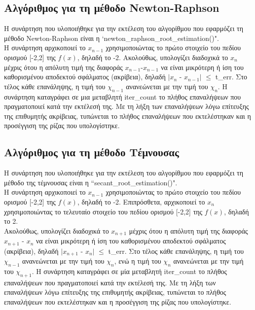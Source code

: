 \documentclass[a4paper,11pt]{article}
\newcommand{\lt}{\latintext}
\begin{document}
\subsection*{Αλγόριθμος για τη μέθοδο {\lt Newton-Raphson }}
Η συνάρτηση που υλοποιήθηκε για την εκτέλεση του αλγορίθμου που εφαρμόζει τη μέθοδο {\lt Newton-Raphson } είναι η {\lt `newton\_raphson\_root\_estimation()"}.\\
Η συνάρτηση αρχικοποιεί το {$x_{n-1}$} χρησιμοποιώντας το πρώτο στοιχείο του πεδίου ορισμού [-2,2] της {\lt $f(x)$}, δηλαδή το -2. Ακολούθως, υπολογίζει διαδοχικά το  {$x_{n}$} μέχρις ότου
η απόλυτη τιμή της διαφοράς {$x_{n-1}$}-{$x_{n-1}$} να είναι μικρότερη ή ίση του καθορισμένου αποδεκτού σφάλματος (ακρίβεια), δηλαδή $|${$x_{n}$} - {$x_{n-1}$}$|$ {$\leq$} {\lt t\_err}. Στο τέλος κάθε επανάληψης, η τιμή 		του {$χ_{n-1}$} ανανεώνεται με την τιμή του {$χ_{n}$}. Η συνάρτηση καταγράφει σε μια μεταβλητή {\lt iter\_count} το πλήθος επαναλήψεων που πραγματοποιεί κατά την εκτέλεσή της. Με τη λήξη των 							επαναλήψεων λόγω επίτευξης της επιθυμητής ακρίβειας, τυπώνεται το πλήθος επαναλήψεων που εκτελέστηκαν και η προσέγγιση της ρίζας που υπολογίστηκε.
\subsection*{Αλγόριθμος για τη μέθοδο Τέμνουσας}
Η συνάρτηση που υλοποιήθηκε για την εκτέλεση του αλγορίθμου που εφαρμόζει τη μέθοδο της τέμνουσας είναι η {\lt ``secant\_root\_estimation()"}. \\
Η συνάρτηση αρχικοποιεί το {$x_{n-1}$} χρησιμοποιώντας το πρώτο στοιχείο του πεδίου ορισμού [-2,2] της {\lt $f(x)$}, δηλαδή το -2. Επιπρόσθετα, αρχικοποιεί το {$x_{n}$} χρησιμοποιώντας το τελευταίο στοιχείο του 				πεδίου ορισμού [-2,2] της {\lt $f(x)$}, δηλαδή το 2.\\
Ακολούθως, υπολογίζει διαδοχικά το {$x_{n+1}$} μέχρις ότου η απόλυτη τιμή της διαφοράς {$x_{n+1}$} - {$x_{n}$} να είναι μικρότερη ή ίση του καθορισμένου αποδεκτού σφάλματος (ακρίβεια), δηλαδή 
$|${$x_{n+1}$} - {$x_{n}$}$|$ {$\leq$} {\lt t\_err}.  Στο τέλος κάθε επανάληψης, η τιμή του {$χ_{n-1}$} ανανεώνεται με την τιμή του {$χ_{n}$}, ενώ η τιμή του {$χ_{n}$} ανανεώνεται με την τιμή του {$χ_{n+1}$}. Η συνάρτηση 			καταγράφει σε μία μεταβλητή {\lt iter\_count} το πλήθος επαναλήψεων που πραγματοποιεί κατά την εκτέλεσή της. Με τη λήξη των επαναλήψεων λόγω επίτευξης της επιθυμητής ακρίβειας, τυπώνεται το πλήθος 			επαναλήψεων που εκτελέστηκαν και η προσέγγιση της ρίζας που υπολογίστηκε. 
\end{document}
